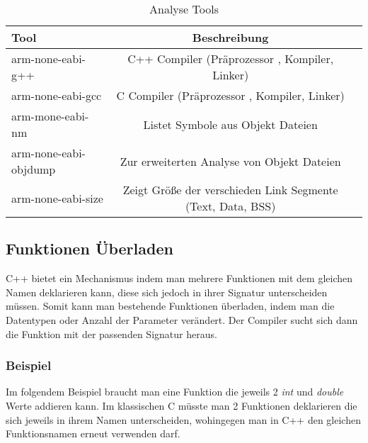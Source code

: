 \documentclass[MES,Master,ngerman]{twbook}%
\begin{document}
\begin{table}[!htb]
	\centering
	\begin{tabular}{| l | c | r |}
		\hline
		\textbf{Tool}  & \textbf{Beschreibung} \\ \hline
		arm-none-eabi-g++           & C++ Compiler (Präprozessor , Kompiler, Linker) \\ \hline
		arm-none-eabi-gcc       	& C	  Compiler (Präprozessor , Kompiler, Linker) \\ \hline
		arm-mone-eabi-nm        	& Listet Symbole aus Objekt Dateien \\ \hline
		arm-none-eabi-objdump		& Zur erweiterten Analyse von Objekt Dateien \\ \hline
		arm-none-eabi-size			& Zeigt Größe der verschieden Link Segmente (Text, Data, BSS) \\ \hline
	\end{tabular}
	
	\caption{Analyse Tools}
	\label{tbl:analystools}
	
\end{table}


\newpage
\subsection{Funktionen Überladen}
C++ bietet ein Mechanismus indem man mehrere Funktionen mit dem gleichen Namen deklarieren kann, diese sich jedoch in ihrer Signatur unterscheiden müssen. Somit kann man bestehende Funktionen überladen, indem man die Datentypen oder Anzahl der Parameter verändert. Der Compiler sucht sich dann die Funktion mit der passenden Signatur heraus. 
\subsubsection{Beispiel} \label{beispiel:1}
Im folgendem Beispiel braucht man eine Funktion die jeweils 2 \textit{int} und \textit{double} Werte addieren kann. Im klassischen C müsste man 2 Funktionen deklarieren die sich jeweils in ihrem Namen unterscheiden, wohingegen man in C++ den gleichen Funktionsnamen erneut verwenden darf.
\begin{figure}[!htb]
	\begin{subfigure}[b]{0.5\textwidth}
		
		\label{fig:1}
	\end{subfigure}
	\begin{subfigure}[b]{0.5\textwidth}
		
		\label{fig:2}
	\end{subfigure}
\end{figure}
\end{document}
